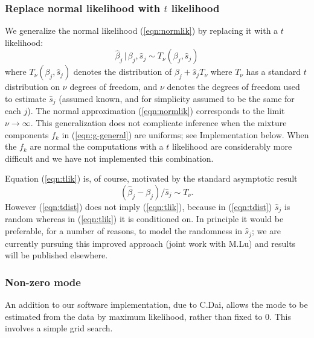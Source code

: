 \documentclass[11pt]{article}
\def\bhat{\hat{\beta}}
\def\shat{\hat{s}}
\begin{document}
\subsubsection*{Replace normal likelihood with $t$ likelihood}

We generalize the normal likelihood (\ref{eqn:normlik}) by replacing it with a $t$ likelihood:
  \begin{equation} \label{eqn:tlik}
 \bhat_j \, | \, \beta_j, \shat_j \sim T_\nu(\beta_j, \shat_j)
 \end{equation}
where $T_\nu(\beta_j,\shat_j)$ denotes the distribution of $\beta_j+\shat_j T_\nu$ where $T_\nu$ has a standard $t$ distribution on $\nu$ degrees of freedom,
and  $\nu$ denotes the degrees of freedom used to estimate $\shat_j$ (assumed known, and for simplicity assumed to be the same for each $j$).
The normal approximation (\ref{eqn:normlik}) corresponds to the limit $\nu \rightarrow \infty$.
This generalization does not complicate inference when the mixture components $f_k$ in (\ref{eqn:g-general}) are uniforms; see Implementation below.
When the $f_k$ are normal the computations with a $t$ likelihood are considerably more difficult and we have not implemented this combination.

Equation (\ref{eqn:tlik}) is, of course, motivated by the standard asymptotic result
\begin{equation} \label{eqn:tdist}
(\bhat_j-\beta_j)/\shat_j \sim T_\nu.
\end{equation}
However (\ref{eqn:tdist}) does not imply (\ref{eqn:tlik}), because in (\ref{eqn:tdist}) $\shat_j$ is random whereas in (\ref{eqn:tlik}) it is conditioned on.
In principle it would be preferable, for a number of reasons, to model the randomness in $\shat_j$; we are
currently pursuing this improved approach (joint work with M.Lu) and results will be published elsewhere. 

\subsubsection*{Non-zero mode}

An addition to our software implementation, due to C.Dai, allows the mode to be estimated from the data by maximum likelihood, rather than fixed to 0.
This involves a simple grid search. 
\end{document}
